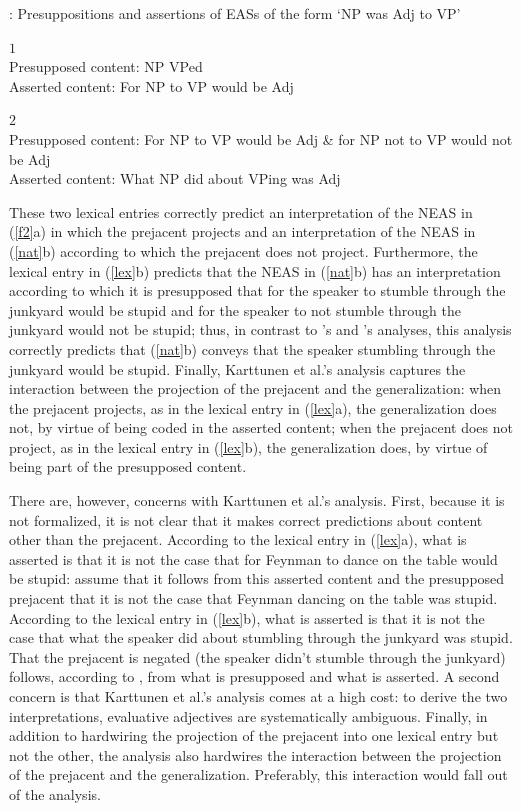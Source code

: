 \documentclass[11pt,fleqn]{article}
\newcommand{\6}{\mbox{$[\hspace*{-.6mm}[$}}
\newcommand{\9}{\mbox{$]\hspace*{-.6mm}]$}}
\newcommand{\citepos}[1]{\citeauthor{#1}'s \citeyear{#1}}
\begin{document}
\begin{exe}
\ex\label{lex} \citealt[249]{karttunen-etal2014}: Presuppositions and assertions of EASs of the form `NP was Adj to VP'
\begin{xlist}
$ 1$
\\ Presupposed content: NP VPed
\\ Asserted content: For NP to VP would be Adj

$ 2$
\\ Presupposed content: For NP to VP would be Adj \& for NP not to VP would not be Adj
\\ Asserted content: What NP did about VPing was Adj

\end{xlist}
\end{exe}
These two lexical entries correctly predict an interpretation of the NEAS in (\ref{f2}a) in which the prejacent projects and an interpretation of the NEAS in (\ref{nat}b) according to which the prejacent does not project. Furthermore, the lexical entry in (\ref{lex}b) predicts that the NEAS in (\ref{nat}b) has an interpretation according to which it is presupposed that for the speaker to stumble through the junkyard would be stupid and for the speaker to not stumble through the junkyard would not be stupid; thus, in contrast to \citepos{oshima09b} and \citepos{barker02} analyses, this analysis correctly predicts that (\ref{nat}b) conveys that the speaker stumbling through the junkyard would be stupid. Finally, Karttunen et al.'s analysis captures the interaction between the projection of the prejacent and the generalization: when the prejacent projects, as in the lexical entry in (\ref{lex}a), the generalization does not, by virtue of being coded in the asserted content;  when the prejacent does not project, as in the lexical entry in (\ref{lex}b), the generalization does, by virtue of being part of the presupposed content.

There are, however, concerns with Karttunen et al.'s analysis. First, because it is not formalized, it is not clear that it makes correct predictions about content other than the prejacent. According to the lexical entry in (\ref{lex}a), what is asserted is that it is not the case that for Feynman to dance on the table would be stupid: \citet[248]{karttunen-etal2014} assume that it follows from this asserted content and the presupposed prejacent that it is not the case that Feynman dancing on the table was stupid. According to the lexical entry in (\ref{lex}b), what is asserted is that it is not the case that what the speaker did about stumbling through the junkyard was stupid. That the prejacent is negated (the speaker didn't stumble through the junkyard) follows, according to \citealt[249]{karttunen-etal2014}, from what is presupposed and what is asserted. A second concern is that Karttunen et al.'s analysis comes at a high cost: to derive the two interpretations, evaluative adjectives are systematically ambiguous. Finally, in addition to hardwiring the projection of the prejacent into one lexical entry but not the other, the analysis also hardwires the interaction between the projection of the prejacent and the generalization. Preferably, this interaction would fall out of the analysis. 
\end{document}
